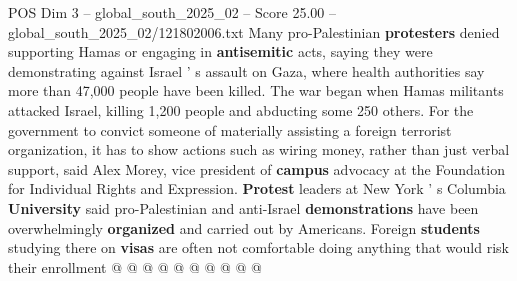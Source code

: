 \begin{textsample}{POS Dim 3 – global\_south\_2025\_02 – Score 25.00 – global\_south\_2025\_02/121802006.txt}
Many pro-Palestinian \textbf{protesters} denied supporting Hamas or engaging in \textbf{antisemitic} acts, saying they were demonstrating against Israel ' s assault on Gaza, where health authorities say more than 47,000 people have been killed.
The war began when Hamas militants attacked Israel, killing 1,200 people and abducting some 250 others.
For the government to convict someone of materially assisting a foreign terrorist organization, it has to show actions such as wiring money, rather than just verbal support, said Alex Morey, vice president of \textbf{campus} advocacy at the Foundation for Individual Rights and Expression. \textbf{Protest} leaders at New York ' s Columbia \textbf{University} said pro-Palestinian and anti-Israel \textbf{demonstrations} have been overwhelmingly \textbf{organized} and carried out by Americans.
Foreign \textbf{students} studying there on \textbf{visas} are often not comfortable doing anything that would risk their enrollment @ @ @ @ @ @ @ @ @ @

\end{textsample}
